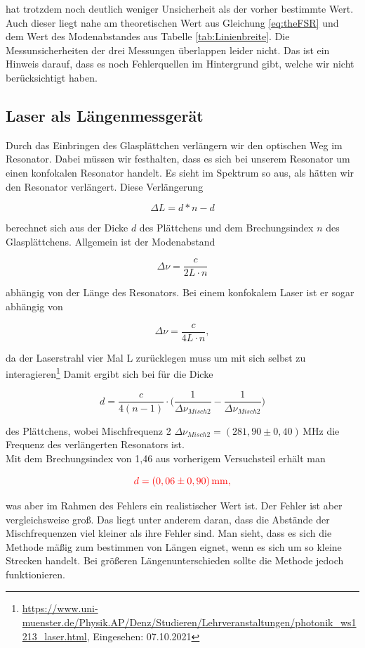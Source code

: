  hat trotzdem noch deutlich weniger Unsicherheit als der vorher bestimmte Wert. Auch dieser liegt nahe am theoretischen Wert aus Gleichung \ref{eq:theFSR} und dem Wert des 
 Modenabstandes aus Tabelle \ref{tab:Linienbreite}. Die Messunsicherheiten der drei Messungen überlappen leider nicht. Das ist ein Hinweis darauf, dass es noch Fehlerquellen im Hintergrund gibt, welche wir nicht
 berücksichtigt haben.

 \subsection*{Laser als Längenmessgerät}

 Durch das Einbringen des Glasplättchen verlängern wir den optischen Weg im Resonator. Dabei müssen wir 
 festhalten, dass es sich bei unserem Resonator um einen konfokalen Resonator handelt. Es sieht im Spektrum so aus, 
 als hätten wir den Resonator verlängert. Diese Verlängerung 

 \begin{equation*}
     \Delta L = d*n - d
 \end{equation*}

 berechnet sich aus der Dicke $d$ des Plättchens und dem Brechungsindex $n$ des Glasplättchens. Allgemein ist der 
 Modenabstand 
 
 \begin{equation*}
     \Delta\nu = \frac{c}{2L\cdot n}
 \end{equation*}

 abhängig von der Länge des Resonators. Bei einem konfokalem Laser ist er sogar abhängig von 

 \begin{equation*}
    \Delta\nu = \frac{c}{4L\cdot n},
\end{equation*}

da der Laserstrahl vier Mal L zurücklegen muss um mit sich selbst zu interagieren\footnote{\url{https://www.uni-muenster.de/Physik.AP/Denz/Studieren/Lehrveranstaltungen/photonik_ws1213_laser.html}, Eingesehen: 07.10.2021}
Damit ergibt sich bei für die Dicke 

\begin{equation}
    d = \frac{c}{4(n-1)}\cdot \biggl( \frac{1}{\Delta\nu_{Misch2}}-\frac{1}{\Delta\nu_{Misch2}} \biggl)
\end{equation}


des Plättchens, wobei Mischfrequenz 2 $\Delta \nu_{Misch2} = (281,90\pm0,40)\,\mathrm{MHz}$ die Frequenz des verlängerten Resonators ist. \\
Mit dem Brechungsindex von 1,46 aus vorherigem Versuchsteil erhält man 

\begin{equation}
    \textcolor{red}{d = (0,06 \pm 0,90)\,\mathrm{mm,}}
\end{equation}

was aber im Rahmen des Fehlers ein realistischer Wert ist. Der Fehler ist aber vergleichsweise groß. Das liegt unter anderem daran, dass die
Abstände der Mischfrequenzen viel kleiner als ihre Fehler sind. Man sieht, dass es sich die Methode mäßig zum bestimmen von Längen eignet, wenn es sich um so kleine Strecken handelt.  Bei größeren Längenunterschieden sollte die Methode jedoch funktionieren. 